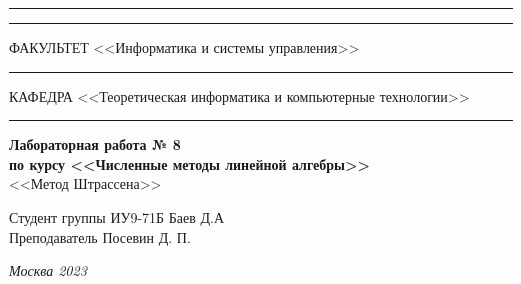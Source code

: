 \documentclass[a4paper, 14pt]{extarticle}
\begin{document}
\begin{titlepage}
\vspace{-25pt}
\hspace{-35pt}\rule{\textwidth}{2.3pt}

\vspace*{-20.3pt}
\hspace{-35pt}\rule{\textwidth}{0.4pt}

\vspace{1.5ex}
\hspace{-35pt} \noindent \small ФАКУЛЬТЕТ\hspace{80pt} <<Информатика и системы управления>>

\vspace*{-16pt}
\hspace{47pt}\rule{0.83\textwidth}{0.4pt}

\vspace{0.5ex}
\hspace{-35pt} \noindent \small КАФЕДРА\hspace{50pt} <<Теоретическая информатика и компьютерные технологии>>

\vspace*{-16pt}
\hspace{30pt}\rule{0.866\textwidth}{0.4pt}

\vspace{11em}

\begin{center}
\Large {\bf Лабораторная работа № 8} \\
\large {\bf по курсу <<Численные методы линейной алгебры>>} \\
\large <<Метод Штрассена>>
\end{center}\normalsize

\vspace{8em}


\begin{flushright}
  {Студент группы ИУ9-71Б Баев Д.А \hspace*{15pt}\\
  \vspace{2ex}
  Преподаватель Посевин Д. П.\hspace*{15pt}}
\end{flushright}

\bigskip

\vfill


\begin{center}
\textsl{Москва 2023}
\end{center}
\end{titlepage}
\end{document}
